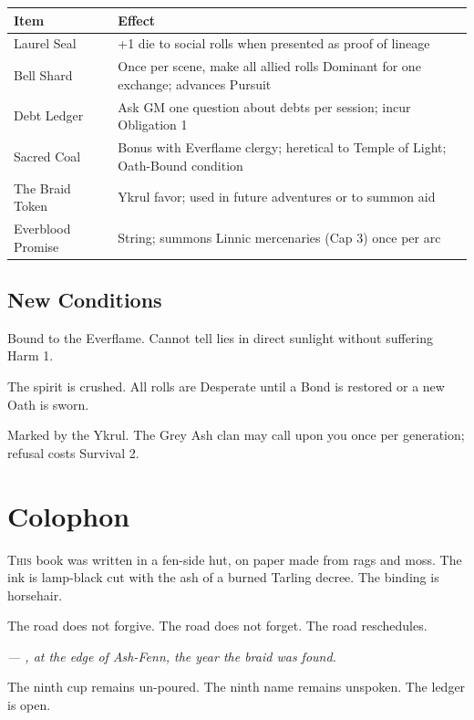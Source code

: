 \documentclass[11pt,a5paper]{book}
\newcommand{\condition}[1]{\textit{#1}}
\begin{document}
\begin{center}
\begin{tabular}{@{}lp{8cm}@{}}
\toprule
\textbf{Item} & \textbf{Effect} \\
\midrule
Laurel Seal & +1 die to social rolls when presented as proof of lineage \\
Bell Shard & Once per scene, make all allied rolls Dominant for one exchange; advances Pursuit \\
Debt Ledger & Ask GM one question about debts per session; incur Obligation 1 \\
Sacred Coal & Bonus with Everflame clergy; heretical to Temple of Light; Oath-Bound condition \\
The Braid Token & Ykrul favor; used in future adventures or to summon aid \\
Everblood Promise & String; summons Linnic mercenaries (Cap 3) once per arc \\
\bottomrule
\end{tabular}
\end{center}

\section*{New Conditions}

\begin{description}[leftmargin=*]
\item[\condition{Oath-Bound}] Bound to the Everflame. Cannot tell lies in direct sunlight without suffering Harm 1.
\item[\condition{Broken}] The spirit is crushed. All rolls are Desperate until a Bond is restored or a new Oath is sworn.
\item[\condition{The Braid}] Marked by the Ykrul. The Grey Ash clan may call upon you once per generation; refusal costs Survival 2.
\end{description}

\clearpage

\chapter*{Colophon}

\lettrine{T}{his} book was written in a fen-side hut, on paper made from rags and moss. The ink is lamp-black cut with the ash of a burned Tarling decree. The binding is horsehair.

The road does not forgive. The road does not forget. The road reschedules.

\vspace{1em}
\noindent \textit{--- \dusana, at the edge of Ash-Fenn, the year the braid was found.}

\vspace{1em}
\noindent The ninth cup remains un-poured. The ninth name remains unspoken. The ledger is open.
\end{document}
